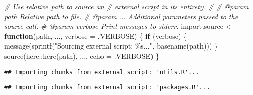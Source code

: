 \documentclass[
  11pt,
  a4paper,
]{scrartcl}
\newenvironment{Shaded}{\begin{snugshade}}{\end{snugshade}}
\newcommand{\AttributeTok}[1]{\textcolor[rgb]{0.77,0.63,0.00}{#1}}
\newcommand{\CommentTok}[1]{\textcolor[rgb]{0.56,0.35,0.01}{\textit{#1}}}
\newcommand{\ControlFlowTok}[1]{\textcolor[rgb]{0.13,0.29,0.53}{\textbf{#1}}}
\newcommand{\DocumentationTok}[1]{\textcolor[rgb]{0.56,0.35,0.01}{\textbf{\textit{#1}}}}
\newcommand{\FunctionTok}[1]{\textcolor[rgb]{0.00,0.00,0.00}{#1}}
\newcommand{\NormalTok}[1]{#1}
\newcommand{\OtherTok}[1]{\textcolor[rgb]{0.56,0.35,0.01}{#1}}
\newcommand{\SpecialCharTok}[1]{\textcolor[rgb]{0.00,0.00,0.00}{#1}}
\newcommand{\StringTok}[1]{\textcolor[rgb]{0.31,0.60,0.02}{#1}}
\begin{document}
\begin{Shaded}
\begin{Highlighting}[]
\CommentTok{\#\textquotesingle{} Use relative path to source an}
\CommentTok{\#\textquotesingle{} external script in its entirety.}
\CommentTok{\#\textquotesingle{}}
\CommentTok{\#\textquotesingle{} @param path Relative path to file.}
\CommentTok{\#\textquotesingle{} @param ... Additional parameters passed to the \textasciigrave{}source\textasciigrave{} call.}
\CommentTok{\#\textquotesingle{} @param verbose Print messages to stderr.}
\NormalTok{import.source }\OtherTok{\textless{}{-}} \ControlFlowTok{function}\NormalTok{(path, ..., }\AttributeTok{verbose =}\NormalTok{ .VERBOSE) \{}
  \ControlFlowTok{if}\NormalTok{ (verbose) \{ }\FunctionTok{message}\NormalTok{(}\FunctionTok{sprintf}\NormalTok{(}\StringTok{"Sourcing external script: \textquotesingle{}\%s\textquotesingle{}..."}\NormalTok{, }\FunctionTok{basename}\NormalTok{(path))) \}}
  \FunctionTok{source}\NormalTok{(here}\SpecialCharTok{::}\FunctionTok{here}\NormalTok{(path), ..., }\AttributeTok{echo =}\NormalTok{ .VERBOSE)}
\NormalTok{\}}
\end{Highlighting}
\end{Shaded}

\begin{Shaded}
\end{Shaded}

\begin{verbatim}
## Importing chunks from external script: 'utils.R'...
\end{verbatim}

\begin{Shaded}
\end{Shaded}

\begin{verbatim}
## Importing chunks from external script: 'packages.R'...
\end{verbatim}

\begin{Shaded}
\end{Shaded}
\end{document}

